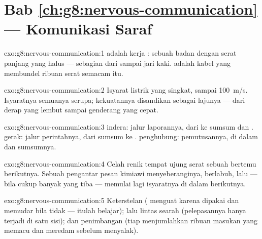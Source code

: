 \section*{Bab \ref{ch:g8:nervous-communication} --- Komunikasi Saraf}

\begin{solution}{exo:g8:nervous-communication:1}
 adalah  kerja : sebuah badan 
dengan serat panjang yang halus --- sebagian dari  sampai jari kaki.  adalah kabel yang membundel
ribuan serat semacam itu.
\end{solution}

\begin{solution}{exo:g8:nervous-communication:2}
Isyarat listrik yang singkat, sampai \qty{100}{m/s}.
Isyaratnya semuanya serupa; kekuatannya disandikan sebagai
lajunya --- dari derap yang lembut sampai genderang yang cepat.
\end{solution}

\begin{solution}{exo:g8:nervous-communication:3}
 indera: jalur laporannya, dari  ke sumsum
dan .  gerak: jalur perintahnya, dari sumsum ke
.  penghubung: pemutusannya, di dalam  dan
sumsumnya.
\end{solution}

\begin{solution}{exo:g8:nervous-communication:4}
Celah renik tempat ujung serat sebuah  bertemu 
berikutnya. Sebuah pengantar pesan kimiawi menyeberanginya,
berlabuh, lalu --- bila cukup banyak yang tiba --- memulai
lagi isyaratnya di dalam  berikutnya.
\end{solution}

\begin{solution}{exo:g8:nervous-communication:5}
Keterstelan ( menguat karena dipakai dan memudar
bila tidak --- itulah belajar); lalu lintas searah
(pelepasannya hanya terjadi di satu sisi); dan penimbangan
(tiap  menjumlahkan ribuan masukan yang memacu dan
meredam sebelum menyalak).
\end{solution}

